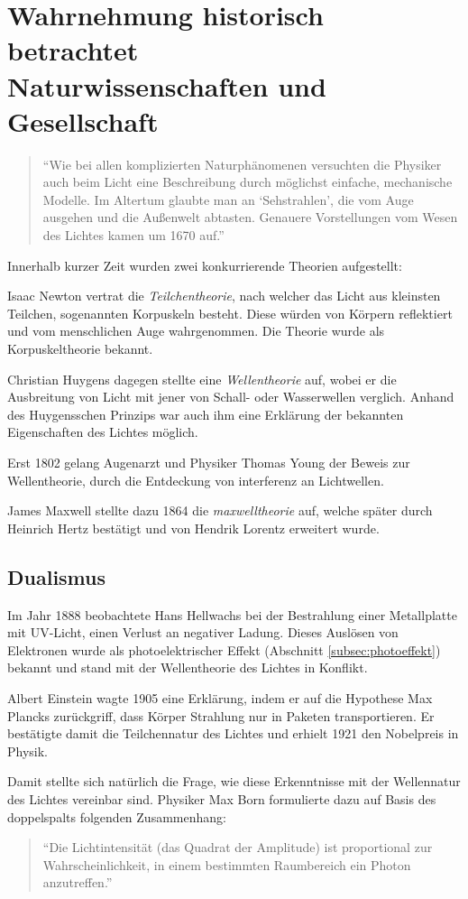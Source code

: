 \section[Wahrnehmung historisch betrachtet\hfill Naturwissenschaften und Gesellschaft]{Wahrnehmung historisch betrachtet\\{\normalsize Naturwissenschaften und Gesellschaft}}
\begin{quote}
\enquote{Wie bei allen komplizierten Naturphänomenen versuchten die Physiker auch beim Licht eine Beschreibung durch möglichst einfache, mechanische Modelle. Im Altertum glaubte man an \enquote{Sehstrahlen}, die vom Auge ausgehen und die Außenwelt abtasten. Genauere Vorstellungen vom Wesen des Lichtes kamen um 1670 auf.} \cite[S. 221]{physik1}
\end{quote}

Innerhalb kurzer Zeit wurden zwei konkurrierende Theorien aufgestellt:
\begin{outline}
	\1 Isaac Newton vertrat die \textit{Teilchentheorie}, nach welcher das Licht aus kleinsten Teilchen, sogenannten Korpuskeln besteht. Diese würden von Körpern reflektiert und vom menschlichen Auge wahrgenommen. Die Theorie wurde als Korpuskeltheorie bekannt.
	
	\1 Christian Huygens dagegen stellte eine \textit{Wellentheorie} auf, wobei er die Ausbreitung von Licht mit jener von Schall- oder Wasserwellen verglich. Anhand des Huygensschen Prinzips war auch ihm eine Erklärung der bekannten Eigenschaften des Lichtes möglich.
\end{outline}

Erst 1802 gelang Augenarzt und Physiker Thomas Young der Beweis zur Wellentheorie, durch die Entdeckung von \gls{interferenz} an Lichtwellen.

James Maxwell stellte dazu 1864 die \textit{\gls{maxwelltheorie}} auf, welche später durch Heinrich Hertz bestätigt und von Hendrik Lorentz erweitert wurde.

\subsection{Dualismus}
Im Jahr 1888 beobachtete Hans Hellwachs bei der Bestrahlung einer Metallplatte mit UV-Licht, einen Verlust an negativer Ladung. Dieses Auslösen von Elektronen wurde als photoelektrischer Effekt (Abschnitt \ref{subsec:photoeffekt}) bekannt und stand mit der Wellentheorie des Lichtes in Konflikt.

Albert Einstein wagte 1905 eine Erklärung, indem er auf die Hypothese Max Plancks zurückgriff, dass Körper Strahlung nur in Paketen transportieren. Er bestätigte damit die Teilchennatur des Lichtes und erhielt 1921 den Nobelpreis in Physik.

Damit stellte sich natürlich die Frage, wie diese Erkenntnisse mit der Wellennatur des Lichtes vereinbar sind. Physiker Max Born formulierte dazu auf Basis des \glspl{doppelspalt} folgenden Zusammenhang:
\begin{quote}
\enquote{Die Lichtintensität (das Quadrat der Amplitude) ist proportional zur Wahrscheinlichkeit, in einem bestimmten Raumbereich ein Photon anzutreffen.} \cite[S. 183]{physik2}
\end{quote}